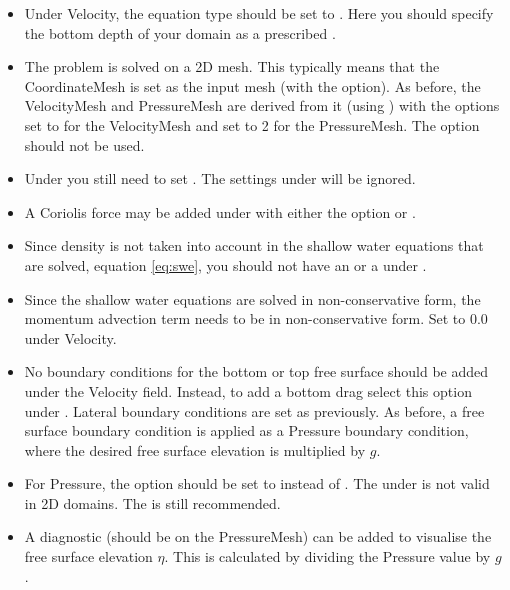 \begin{itemize}
  \item Under Velocity, the equation type should be set to
    . Here you should specify the bottom depth
    of your domain as a prescribed .
  \item The problem is solved on a 2D mesh. This typically means that the
    CoordinateMesh is set as the input mesh (with the 
    option). As before, the VelocityMesh and PressureMesh are derived from it (using
    ) with the options  set to
     for the VelocityMesh and 
     set to 2 for the PressureMesh.
    The option  should not be used.
  \item Under  you still need to set
    . The settings under
     will be ignored.
  \item A Coriolis force may be added under  with
    either the option  or .
  \item Since density is not taken into account in the shallow water equations
    that are solved, equation \eqref{eq:swe}, you should not have an
     or a  under
    .
  \item Since the shallow water equations are solved in non-conservative form,
    the momentum advection term needs to be in non-conservative form. Set
     to 0.0
    under Velocity.
  \item No boundary conditions for the bottom or top free surface should be
    added under the Velocity field. Instead, to add a bottom drag select this
    option under . Lateral boundary conditions
    are set as previously. As before, a free surface boundary condition is
    applied as a Pressure boundary condition, where the desired free surface
    elevation is multiplied by $g$.
  \item For Pressure, the option  should
    be set to  instead of .
    The  under  is not
    valid in 2D domains. The  is still recommended.
  \item A diagnostic  (should be on the
    PressureMesh) can be added to
    visualise the free surface elevation $\eta$. This is calculated by dividing
    the Pressure value by $g$.
\end{itemize}

